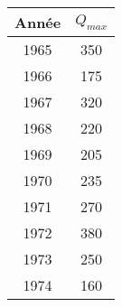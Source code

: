 \begin{tabular}{c|c}
    \textbf{Année} & \textbf{$Q_{max}$} \\
    \hline
    1965 & 350 \\
    1966 & 175 \\
    1967 & 320 \\
    1968 & 220 \\
    1969 & 205 \\
    1970 & 235 \\
    1971 & 270 \\
    1972 & 380 \\
    1973 & 250 \\
    1974 & 160 \\
    \hline
\end{tabular}
